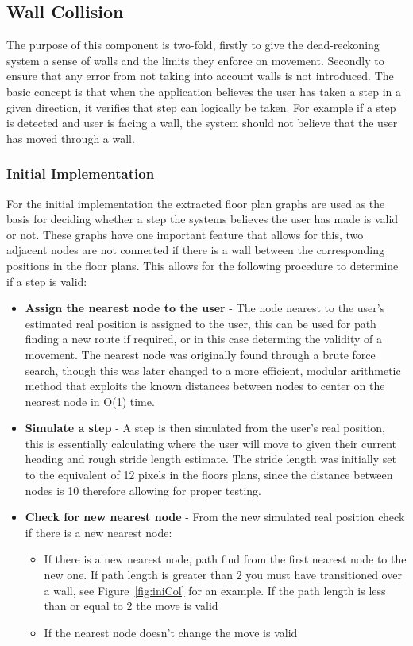 \documentclass[main.tex]{subfiles}
\begin{document}
\subsection{Wall Collision}

The purpose of this component is two-fold, firstly to give the dead-reckoning system a sense of walls and the limits they enforce on movement. Secondly to ensure that any error from not taking into account walls is not introduced. The basic concept is that when the application believes the user has taken a step in a given direction, it verifies that step can logically be taken. For example if a step is detected and user is facing a wall, the system should not believe that the user has moved through a wall.

\subsubsection{Initial Implementation}

For the initial implementation the extracted floor plan graphs are used as the basis for deciding whether a step the systems believes the user has made is valid or not. These graphs have one important feature that allows for this, two adjacent nodes are not connected if there is a wall between the corresponding positions in the floor plans. This allows for the following procedure to determine if a step is valid:

\begin{itemize}
	\item \textbf{Assign the nearest node to the user} - The node nearest to the user's estimated real position is assigned to the user, this can be used for path finding a new route if required, or in this case determing the validity of a movement. The nearest node was originally found through a brute force search, though this was later changed to a more efficient, modular arithmetic method that exploits the known distances between nodes to center on the nearest node in O(1) time.
	\item \textbf{Simulate a step} - A step is then simulated from the user's real position, this is essentially calculating where the user will move to given their current heading and rough stride length estimate. The stride length was initially set to the equivalent of 12 pixels in the floors plans, since the distance between nodes is 10 therefore allowing for proper testing. 
	\item \textbf{Check for new nearest node} - From the new simulated real position check if there is a new nearest node:
	\begin{itemize}
		\item If there is a new nearest node, path find from the first nearest node to the new one. If path length is greater than 2 you must have transitioned over a wall, see Figure~\ref{fig:iniCol} for an example. If the path length is less than or equal to 2 the move is valid
		\item If the nearest node doesn't change the move is valid
	\end{itemize}
\end{itemize}
\end{document}
